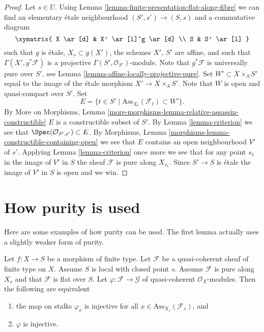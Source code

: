 \begin{proof}
Let $s \in U$. Using
Lemma \ref{lemma-finite-presentation-flat-along-fibre}
we can find an elementary \'etale neighbourhood
$(S', s') \to (S, s)$ and a commutative diagram
$$
\xymatrix{
X \ar[d] & X' \ar[l]^g \ar[d] \\
S & S' \ar[l]
}
$$
such that $g$ is \'etale, $X_s \subset g(X')$, the schemes
$X'$, $S'$ are affine, and such that $\Gamma(X', g^*\mathcal{F})$
is a projective $\Gamma(S', \mathcal{O}_{S'})$-module.
Note that $g^*\mathcal{F}$ is universally pure over $S'$, see
Lemma \ref{lemma-affine-locally-projective-pure}.
Set $W' \subset X \times_S S'$ equal to the image of the \'etale morphism
$X' \to X \times_S S'$. Note that $W$ is open and quasi-compact over
$S'$. Set
$$
E = \{t \in S' \mid \text{Ass}_{X_t}(\mathcal{F}_t) \subset W' \}.
$$
By
More on Morphisms,
Lemma \ref{more-morphisms-lemma-relative-assassin-constructible}
$E$ is a constructible subset of $S'$. By
Lemma \ref{lemma-criterion}
we see that $\Spec(\mathcal{O}_{S', s'}) \subset E$.
By
Morphisms, Lemma \ref{morphisms-lemma-constructible-containing-open}
we see that $E$ contains an open neighbourhood $V'$ of $s'$.
Applying
Lemma \ref{lemma-criterion}
once more we see that for any point $s_1$ in the image of $V'$ in $S$
the sheaf $\mathcal{F}$ is pure along $X_{s_1}$. Since
$S' \to S$ is \'etale the image of $V'$ in $S$ is open and we win.
\end{proof}


\section{How purity is used}
\label{section-applications-purity}

\noindent
Here are some examples of how purity can be used. The first lemma
actually uses a slightly weaker form of purity.

\begin{lemma}
\label{lemma-injectivity-map-source-flat-pure}
Let $f : X \to S$ be a morphism of finite type.
Let $\mathcal{F}$ be a quasi-coherent sheaf of finite type on $X$.
Assume $S$ is local with closed point $s$.
Assume $\mathcal{F}$ is pure along $X_s$ and
that $\mathcal{F}$ is flat over $S$.
Let $\varphi : \mathcal{F} \to \mathcal{G}$ of quasi-coherent
$\mathcal{O}_X$-modules. Then the following are equivalent
\begin{enumerate}
\item the map on stalks $\varphi_x$ is injective for all
$x \in \text{Ass}_{X_s}(\mathcal{F}_s)$, and
\item $\varphi$ is injective.
\end{enumerate}
\end{lemma}

